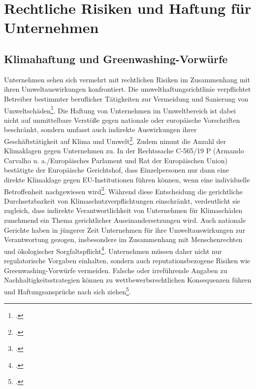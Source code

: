 \section{Rechtliche Risiken und Haftung für Unternehmen}
%
\subsection{Klimahaftung und Greenwashing-Vorwürfe}
%
Unternehmen sehen sich vermehrt mit rechtlichen Risiken im Zusammenhang mit ihren Umweltauswirkungen konfrontiert. Die {umwelthaftungsrichtlinie} verpflichtet Betreiber bestimmter beruflicher Tätigkeiten zur Vermeidung und Sanierung von Umweltschäden\footcite[Art. 3-6]{eu_umwelthaftung}.
%
Die Haftung von Unternehmen im Umweltbereich ist dabei nicht auf unmittelbare Verstöße gegen nationale oder europäische Vorschriften beschränkt, sondern umfasst auch indirekte Auswirkungen ihrer Geschäftstätigkeit auf Klima und Umwelt\footcite[]{eu_nature_restoration}.  
%
Zudem nimmt die Anzahl der Klimaklagen gegen Unternehmen zu. In der Rechtssache C-565/19 P (Armando Carvalho u. a./Europäisches Parlament und Rat der Europäischen Union) bestätigte der Europäische Gerichtshof, dass Einzelpersonen nur dann eine direkte Klimaklage gegen EU-Institutionen führen können, wenn eine individuelle Betroffenheit nachgewiesen wird\footcite[]{eu_klimaklage}.  
%
Während diese Entscheidung die gerichtliche Durchsetzbarkeit von Klimaschutzverpflichtungen einschränkt, verdeutlicht sie zugleich, dass indirekte Verantwortlichkeit von Unternehmen für Klimaschäden zunehmend ein Thema gerichtlicher Auseinandersetzungen wird. Auch nationale Gerichte haben in jüngerer Zeit Unternehmen für ihre Umweltauswirkungen zur Verantwortung gezogen, insbesondere im Zusammenhang mit Menschenrechten und ökologischer Sorgfaltspflicht\footcite[]{eu_csddd}.  
%
Unternehmen müssen daher nicht nur regulatorische Vorgaben einhalten, sondern auch reputationsbezogene Risiken wie Greenwashing-Vorwürfe vermeiden. Falsche oder irreführende Angaben zu Nachhaltigkeitsstrategien können zu wettbewerbsrechtlichen Konsequenzen führen und Haftungsansprüche nach sich ziehen\footcite[]{eu_taxonomie}.
%